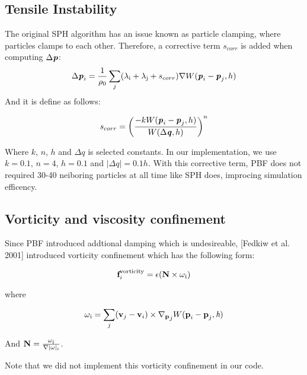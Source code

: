 \documentclass[acmtog]{acmart}
\begin{document}
\subsection{Tensile Instability}
The original SPH algorithm has an issue known as particle clamping, where particles clamps to each other. 
Therefore, a corrective term $s_{corr}$ is added when computing $\Delta \textbf{\textit{p}}$:
  \begin{equation}
    \Delta \textbf{\textit{p}}_{i} = \frac{1}{\rho \textsubscript{0}} 
    \sum_{j} (\lambda \textsubscript{i} + \lambda \textsubscript{j} + s_{corr})
    \nabla W(\textbf{\textit{p}}_{i} - \textbf{\textit{p}}_{j}, h)
  \end{equation}
And it is define as follows:

\begin{equation}
  s_{corr} = \left( \frac{ -k W(\textbf{\textit{p}}_{i} - \textbf{\textit{p}}_{j}, h)} {W(\Delta \textbf{\textit{q}}, h)} \right) ^n
\end{equation}

Where $k$, $n$, $h$ and $\Delta q$ is selected constants. In our implementation, we use $k = 0.1$, $n = 4$, $h = 0.1 $ and $|\Delta q| = 0.1h$.
With this corrective term, PBF does not required 30-40 neiboring particles at all time like SPH does, improcing simulation efficency. 

\subsection{Vorticity and viscosity confinement}
Since PBF introduced addtional damping which is undesireable, [Fedkiw et al. 2001] introduced vorticity confinement 
which has the following form:

\begin{equation}
  \textbf{f}_{i}^{\text{vorticity}} = \epsilon( \textbf{N} \times \omega \textsubscript{i})
\end{equation}

where

\begin{equation}
  \omega \textsubscript{i} = \sum_{j} (\textbf{v}_{j} - \textbf{v}_{i}) \times \nabla \textsubscript{\textbf{p}}_{j} W(\textbf{p}_{i} - \textbf{p}_{j}, \textit{h})
\end{equation}

And $\textbf{N} = \frac{\omega \textsubscript{i}}{\nabla |\omega| _{i}}$.

Note that we did not implement this vorticity confinement in our code.
\end{document}
